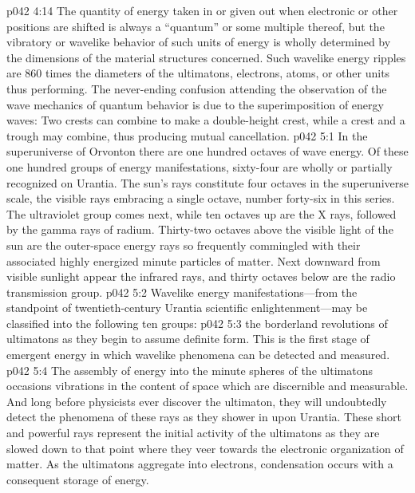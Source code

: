 \vs p042 4:14 The quantity of energy taken in or given out when electronic or other positions are shifted is always a “quantum” or some multiple thereof, but the vibratory or wavelike behavior of such units of energy is wholly determined by the dimensions of the material structures concerned. Such wavelike energy ripples are 860 times the diameters of the ultimatons, electrons, atoms, or other units thus performing. The never\hyp{}ending confusion attending the observation of the wave mechanics of quantum behavior is due to the superimposition of energy waves: Two crests can combine to make a double\hyp{}height crest, while a crest and a trough may combine, thus producing mutual cancellation.
%
\vs p042 5:1 In the superuniverse of Orvonton there are one hundred octaves of wave energy. Of these one hundred groups of energy manifestations, sixty\hyp{}four are wholly or partially recognized on Urantia. The sun’s rays constitute four octaves in the superuniverse scale, the visible rays embracing a single octave, number forty\hyp{}six in this series. The ultraviolet group comes next, while ten octaves up are the X rays, followed by the gamma rays of radium. Thirty\hyp{}two octaves above the visible light of the sun are the outer\hyp{}space energy rays so frequently commingled with their associated highly energized minute particles of matter. Next downward from visible sunlight appear the infrared rays, and thirty octaves below are the radio transmission group.
\pc \vs p042 5:2 Wavelike energy manifestations---from the standpoint of twentieth\hyp{}century Urantia scientific enlightenment---may be classified into the following ten groups:
\pc \vs p042 5:3 \bibnobreakspace {}the borderland revolutions of ultimatons as they begin to assume definite form. This is the first stage of emergent energy in which wavelike phenomena can be detected and measured.
\pc \vs p042 5:4 \bibnobreakspace {} The assembly of energy into the minute spheres of the ultimatons occasions vibrations in the content of space which are discernible and measurable. And long before physicists ever discover the ultimaton, they will undoubtedly detect the phenomena of these rays as they shower in upon Urantia. These short and powerful rays represent the initial activity of the ultimatons as they are slowed down to that point where they veer towards the electronic organization of matter. As the ultimatons aggregate into electrons, condensation occurs with a consequent storage of energy.\plusone
